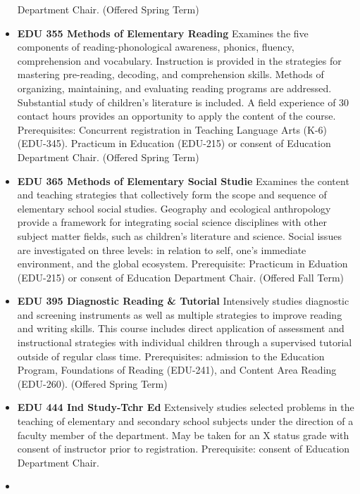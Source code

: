 \documentclass[
  letterpaper,
]{scrbook}
\begin{document}
\begin{itemize}
  Department Chair. (Offered Spring Term)\\
\item
  \textbf{EDU 355 Methods of Elementary Reading} Examines the five
  components of reading-phonological awareness, phonics, fluency,
  comprehension and vocabulary. Instruction is provided in the
  strategies for mastering pre-reading, decoding, and comprehension
  skills. Methods of organizing, maintaining, and evaluating reading
  programs are addressed. Substantial study of children's literature is
  included. A field experience of 30 contact hours provides an
  opportunity to apply the content of the course. Prerequisites:
  Concurrent registration in Teaching Language Arts (K-6) (EDU-345).
  Practicum in Education (EDU-215) or consent of Education Department
  Chair. (Offered Spring Term)\\
\item
  \textbf{EDU 365 Methods of Elementary Social Studie} Examines the
  content and teaching strategies that collectively form the scope and
  sequence of elementary school social studies. Geography and ecological
  anthropology provide a framework for integrating social science
  disciplines with other subject matter fields, such as children's
  literature and science. Social issues are investigated on three
  levels: in relation to self, one's immediate environment, and the
  global ecosystem. Prerequisite: Practicum in Eduation (EDU-215) or
  consent of Education Department Chair. (Offered Fall Term)\\
\item
  \textbf{EDU 395 Diagnostic Reading \& Tutorial} Intensively studies
  diagnostic and screening instruments as well as multiple strategies to
  improve reading and writing skills. This course includes direct
  application of assessment and instructional strategies with individual
  children through a supervised tutorial outside of regular class time.
  Prerequisites: admission to the Education Program, Foundations of
  Reading (EDU-241), and Content Area Reading (EDU-260). (Offered Spring
  Term)\\
\item
  \textbf{EDU 444 Ind Study-Tchr Ed} Extensively studies selected
  problems in the teaching of elementary and secondary school subjects
  under the direction of a faculty member of the department. May be
  taken for an X status grade with consent of instructor prior to
  registration. Prerequisite: consent of Education Department Chair.\\
\item

\end{itemize}
\end{document}
